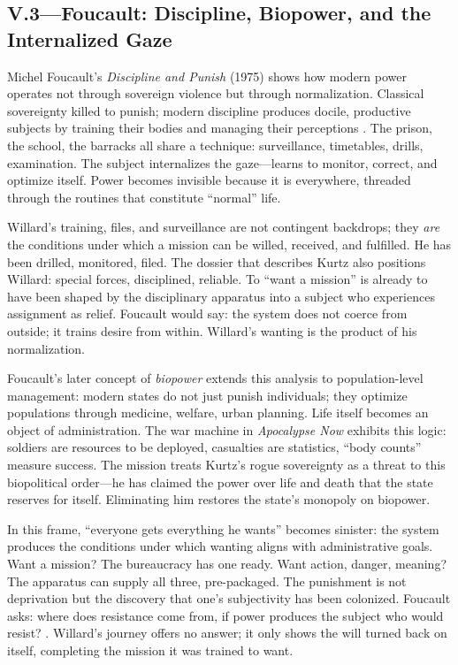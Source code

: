 \subsection*{V.3—Foucault: Discipline, Biopower, and the Internalized Gaze}
\label{ssec:v-foucault}
Michel Foucault's \textit{Discipline and Punish} (1975) shows how modern power operates not 
through sovereign violence but through normalization. Classical sovereignty killed to punish; 
modern discipline produces docile, productive subjects by training their bodies and managing 
their perceptions \parencite{FoucaultDiscipline1995}. The prison, the school, the barracks all 
share a technique: surveillance, timetables, drills, examination. The subject internalizes the 
gaze---learns to monitor, correct, and optimize itself. Power becomes invisible because it is 
everywhere, threaded through the routines that constitute ``normal'' life.

Willard's training, files, and surveillance are not contingent backdrops; they \emph{are} the 
conditions under which a mission can be willed, received, and fulfilled. He has been drilled, 
monitored, filed. The dossier that describes Kurtz also positions Willard: special forces, 
disciplined, reliable. To ``want a mission'' is already to have been shaped by the disciplinary 
apparatus into a subject who experiences assignment as relief. Foucault would say: the system 
does not coerce from outside; it trains desire from within. Willard's wanting is the product of 
his normalization.

Foucault's later concept of \emph{biopower} extends this analysis to population-level 
management: modern states do not just punish individuals; they optimize populations through 
medicine, welfare, urban planning. Life itself becomes an object of 
administration. The war machine in \textit{Apocalypse Now} exhibits this logic: soldiers are 
resources to be deployed, casualties are statistics, ``body counts'' measure success. The 
mission treats Kurtz's rogue sovereignty as a threat to this biopolitical order---he has 
claimed the power over life and death that the state reserves for itself. Eliminating him 
restores the state's monopoly on biopower.

In this frame, ``everyone gets everything he wants'' becomes sinister: the system produces the 
conditions under which wanting aligns with administrative goals. Want a mission? The bureaucracy 
has one ready. Want action, danger, meaning? The apparatus can supply all three, pre-packaged. 
The punishment is not deprivation but the discovery that one's subjectivity has been colonized. 
Foucault asks: where does resistance come from, if power produces the subject who would resist? 
\parencite{FoucaultDiscipline1995}. Willard's journey offers no answer; it only shows the will 
turned back on itself, completing the mission it was trained to want.

